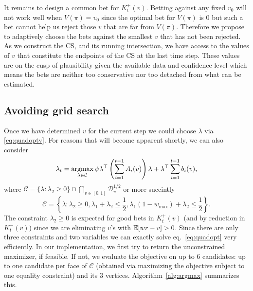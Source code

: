 It remains to design a common bet for $K_t^{+}(v)$.  Betting against any fixed
$v_0$ will not work well when $V(\pi)=v_0$ since the optimal bet for $V(\pi)$
is 0 but such a bet cannot help us reject those $v$ that are far from $V(\pi)$.
Therefore we propose to adaptively choose the bets against the smallest $v$
that has not been rejected. As we construct the CS, and its
running intersection, we have access to the values of $v$ that constitute the
endpoints of the CS at the last time step. These values are on
the cusp of plausibility given the available data and confidence level which
means the bets are neither too conservative nor too detached from what can be
estimated.

\subsection{Avoiding grid search}
\label{sec:avoid-grid}
Once we have determined $v$ for the current step we could choose $\lambda$ via
\eqref{eq:quadoptv}. For reasons that will become apparent shortly, we can also
consider
\begin{equation}
\lambda_t = \operatorname*{argmax}_{\lambda \in \mathcal{C}}
\psi  \lambda^\top \left(\sum_{i=1}^{t-1} A_i(v)\right) \lambda 
+ \lambda^\top \sum_{i=1}^{t-1} b_i(v),
\label{eq:quadopt}
\end{equation}
where $\mathcal{C}=\{\lambda: \lambda_2 \geq 0\}\cap \bigcap_{v\in [0,1]} \mathcal{D}_v^{1/2}$
or more succintly
$$
\mathcal{C} = \left\{\lambda: \lambda_2\geq 0, 
\lambda_1 + \lambda_2 \leq \frac{1}{2},
\lambda_1 \left(1-w_{\max}\right) + \lambda_2 \leq  \frac{1}{2}
\right\}.
$$
The constraint $\lambda_2\geq 0$ is expected for good bets in $K_t^+(v)$ (and
by reduction in $K_t^-(v)$) since we are eliminating $v$'s with $\mathbb{E}[wr-v]>0$.
Since there are only three constraints and two variables we can exactly solve
eq.~\eqref{eq:quadopt} very efficiently. In our implementation, we first try to
return the unconstrained maximizer, if feasible.  If not, we evaluate the
objective on up to 6 candidates: up to one candidate per face of $\mathcal{C}$
(obtained via maximizing the objective subject to one equality constraint) and
its 3 vertices. Algorithm~\ref{alg:argmax} summarizes this.


